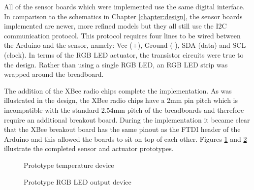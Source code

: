       All of the sensor boards which were implemented use the same digital interface. In comparison to the schematics in Chapter \ref{chapter:design}, the sensor boards implemented are newer, more refined models but they all still use the I2C communication protocol. This protocol requires four lines to be wired between the Arduino and the sensor, namely: Vcc (+), Ground (-), SDA (data) and SCL (clock). In terms of the RGB LED actuator, the transistor circuits were true to the design. Rather than using a single RGB LED, an RGB LED strip was wrapped around the breadboard.

      The addition of the XBee radio chips complete the implementation. As was illustrated in the design, the XBee radio chips have a 2mm pin pitch which is incompatible with the standard 2.54mm pitch of the breadboards and therefore require an additional breakout board. During the implementation it became clear that the XBee breakout board has the same pinout as the FTDI header of the Arduino and this allowed the boards to sit on top of each other. Figures \ref{figure:temp-device} and \ref{figure:led-device} illustrate the completed sensor and actuator prototypes.

      \begin{figure}
        \centering
        \caption{Prototype temperature device}\label{figure:temp-device}
      \end{figure}

      \begin{figure}
        \centering
        \caption{Prototype RGB LED output device}\label{figure:led-device}
      \end{figure}

